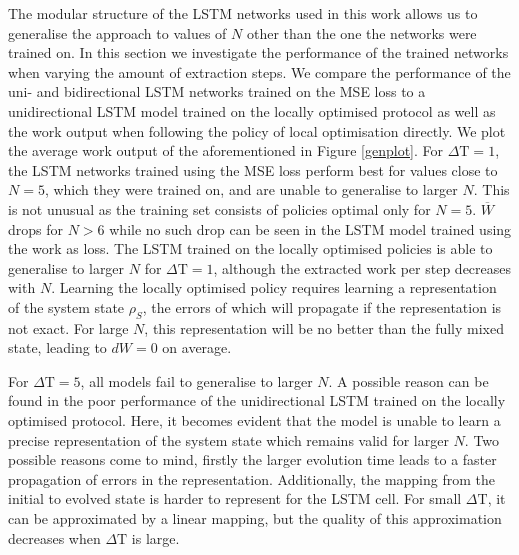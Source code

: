 The modular structure of the LSTM networks used in this work allows us to generalise the approach to values of $N$ other than the one the networks were trained on.
In this section we investigate the performance of the trained networks when varying the amount of extraction steps.
We compare the performance of the uni- and bidirectional LSTM networks trained on the MSE loss to a unidirectional LSTM model trained on the locally optimised protocol as well as the work output when following the policy of local optimisation directly.
We plot the average work output of the aforementioned in Figure \ref{genplot}.
For $\Delta \mathrm{T} = 1$, the LSTM networks trained using the MSE loss perform best for values close to $N=5$, which they were trained on, and are unable to generalise to larger $N$.
This is not unusual as the training set consists of policies optimal only for $N=5$.
$\overline{W}$ drops for $N > 6$ while no such drop can be seen in the LSTM model trained using the work as loss.
The LSTM trained on the locally optimised policies is able to generalise to larger $N$ for $\Delta \mathrm{T} = 1$, although the extracted work per step decreases with $N$.
Learning the locally optimised policy requires learning a representation of the system state $\rho_S$, the errors of which will propagate if the representation is not exact.
For large $N$, this representation will be no better than the fully mixed state, leading to $dW = 0$ on average.

For $\Delta \mathrm{T} = 5$, all models fail to generalise to larger $N$.
A possible reason can be found in the poor performance of the unidirectional LSTM trained on the locally optimised protocol.
Here, it becomes evident that the model is unable to learn a precise representation of the system state which remains valid for larger $N$.
Two possible reasons come to mind, firstly the larger evolution time leads to a faster propagation of errors in the representation.
Additionally, the mapping from the initial to evolved state is harder to represent for the LSTM cell.
For small $\Delta \mathrm{T}$, it can be approximated by a linear mapping, but the quality of this approximation decreases when $\Delta \mathrm{T}$ is large.

